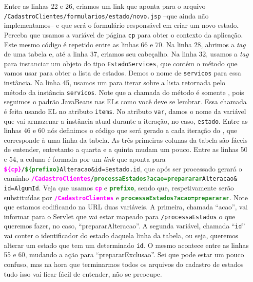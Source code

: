 Entre as linhas 22 e 26, criamos um link que aponta para o arquivo\linebreak%
 \texttt{/CadastroClientes/formularios/estado/novo.jsp} –que ainda não implementamos– e que será o formulário responsável em criar um novo estado. Perceba que usamos a variável de página \texttt{cp} para obter o contexto da aplicação. Este mesmo código é repetido entre as linhas 66 e 70. Na linha 28, abrimos a \textit{tag} de uma tabela e, até a linha 37, criamos seu cabeçalho. Na linha 32, usamos a \textit{tag}  para instanciar um objeto do tipo \texttt{EstadoServices}, que contém o método que vamos usar para obter a lista de estados. Demos o nome de \texttt{servicos} para essa instância. Na linha 45, usamos um  para iterar sobre a lista retornada pelo método  da instância \texttt{servicos}. Note que a chamada do método  é somente , pois seguimos o padrão JavaBeans nas ELs como você deve se lembrar. Essa chamada é feita usando EL no atributo \texttt{items}. No atributo \texttt{var}, damos o nome da variável que vai armazenar a instância atual durante a iteração, no caso, \texttt{estado}. Entre as linhas 46 e 60 nós definimos o código que será gerado a cada iteração do , que corresponde à uma linha da tabela. As três primeiras colunas da tabela são fáceis de entender, entretanto a quarta e a quinta mudam um pouco. Entre as linhas 50 e 54, a coluna é formada por um \textit{link} que aponta para \texttt{\textbf{\textcolor{Fuchsia}{\$\{cp\}}}/\textbf{\textcolor{ForestGreen}{\$\{prefixo\}}}Alteracao\&id=\${estado.id}}, que após ser processado gerará o caminho \texttt{\textbf{\textcolor{Fuchsia}{/CadastroClientes}}/\textbf{\textcolor{ForestGreen}{processaEstados?acao=prepararar}}Alteracao\&}\linebreak%
\texttt{id=AlgumId}. Veja que usamos \textcolor{Fuchsia}{\texttt{\textbf{cp}}} e \textcolor{ForestGreen}{\texttt{\textbf{prefixo}}}, sendo que, respetivamente serão substituídas por \textcolor{Fuchsia}{\texttt{\textbf{/CadastroClientes}}} e \textcolor{ForestGreen}{\texttt{\textbf{processaEstados?acao=prepararar}}}. Note que estamos codificando na URL duas variáveis. A primeira, chamada ``acao'', vai informar para o Servlet que vai estar mapeado para \texttt{/processaEstados} o que queremos fazer, no caso, ``prepararAlteracao''. A segunda variável, chamada ``\texttt{id}'' vai conter o identificador do estado daquela linha da tabela, ou seja, queremos alterar um estado que tem um determinado \texttt{id}. O mesmo acontece entre as linhas 55 e 60, mudando a ação para ``prepararExclusao''. Sei que pode estar um pouco confuso, mas na hora que terminarmos todos os arquivos do cadastro de estados tudo isso vai ficar fácil de entender, não se preocupe.


